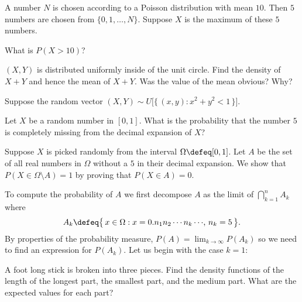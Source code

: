 \begin{problem}[Handout 16, \# 2]
  A number \(N\) is chosen according to a Poisson distribution with mean
  \(10\). Then \(5\) numbers are chosen from \(\{0,1,\dotsc,N\}\). Suppose
  \(X\) is the maximum of these \(5\) numbers.

  What is \(P(X>10)\)?
\end{problem}
\begin{solution}
\end{solution}
\newpage

\begin{problem}[Handout 18, \# 15]
  \((X,Y)\) is distributed uniformly inside of the unit circle. Find the
  density of \(X+Y\) and hence the mean of \(X+Y\). Was the value of the
  mean obvious? Why?
\end{problem}
\begin{solution}
  Suppose the random vector \((X,Y)\sim
  U\bigl[\{\,(x,y):x^2+y^2<1\,\}\bigr]\).
\end{solution}
\newpage

\begin{problem}[Handout 18, \# 16]
  Let \(X\) be a random number in \([0,1]\). What is the probability that
  the number \(5\) is completely missing from the decimal expansion of
  \(X\)?
\end{problem}
\begin{solution}
  Suppose \(X\) is picked randomly from the interval
  \(\Omega\defeq [0,1]\). Let \(A\) be the set of all real numbers in
  \(\Omega\) without a \(5\) in their decimal expansion. We show that
  \(P(X\in \Omega\setminus A)=1\) by proving that \(P(X\in A)=0\).

  To compute the probability of \(A\) we first decompose \(A\) as the limit
  of \(\bigcap_{k=1}^n A_k\) where
  \[
    A_k\defeq\bigl\{\,x\in\Omega:\text{\(x=0.n_1n_2\dotsm n_k\dotsm\),
      \(n_k=5\)}\,\bigr\}.
  \]
  By properties of the probability measure, \(P(A)=\lim_{k\to\infty}
  P(A_k)\) so we need to find an expression for \(P(A_k)\). Let us begin
  with the case \(k=1\):
\end{solution}
\newpage

\begin{problem}[Handout 18, \# 17]
  A foot long stick is broken into three pieces. Find the density functions
  of the length of the longest part, the smallest part, and the medium
  part. What are the expected values for each part?
\end{problem}
\begin{solution}

\end{solution}

